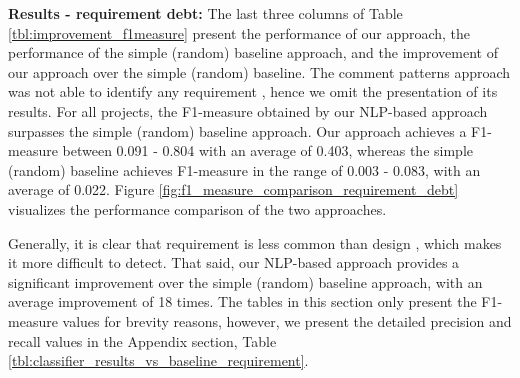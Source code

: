 
 
\noindent \textbf{Results - requirement debt:}  The last three columns of Table \ref{tbl:improvement_f1measure} present the performance of our approach, the performance of the simple (random) baseline approach, and the improvement of our approach over the simple (random) baseline. The comment patterns approach was not able to identify any requirement \SATD, hence we omit the presentation of its results. For all projects, the F1-measure obtained by our NLP-based approach surpasses the simple (random) baseline approach. Our approach achieves a F1-measure between 0.091 - 0.804 with an average of 0.403, whereas the simple (random) baseline achieves F1-measure in the range of 0.003 - 0.083, with an average of 0.022. Figure \ref{fig:f1_measure_comparison_requirement_debt} visualizes the performance comparison of the two approaches.

Generally, it is clear that requirement \SATD is less common than design \SATD, which makes it more difficult to detect. That said, our NLP-based approach provides a significant improvement over the simple (random) baseline approach, with an average improvement of 18 times. The tables in this section only present the F1-measure values for brevity reasons, however, we present the detailed precision and recall values in the Appendix section, Table \ref{tbl:classifier_results_vs_baseline_requirement}.

